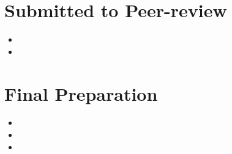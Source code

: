 \documentclass[a4paper]{article}
\begin{document}
\section*{Submitted to Peer-review}

\begin{itemize}


  \item {}

  \item {}


\end{itemize}


\section*{Final Preparation}

\begin{itemize}


  \item {}

  \item {}

  \item {}


\end{itemize}
\end{document}
